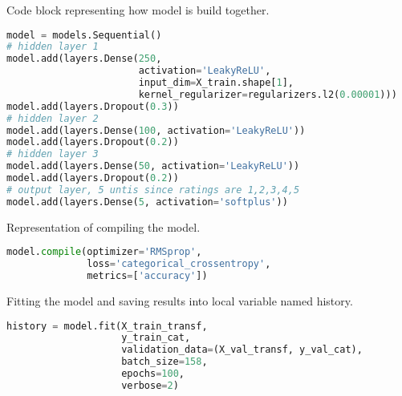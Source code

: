Code block representing how model is build together.
\begin{lstlisting}[language=Python, caption=Build model]
model = models.Sequential()
# hidden layer 1
model.add(layers.Dense(250, 
                       activation='LeakyReLU', 
                       input_dim=X_train.shape[1], 
                       kernel_regularizer=regularizers.l2(0.00001)))
model.add(layers.Dropout(0.3))
# hidden layer 2
model.add(layers.Dense(100, activation='LeakyReLU'))
model.add(layers.Dropout(0.2))
# hidden layer 3
model.add(layers.Dense(50, activation='LeakyReLU'))
model.add(layers.Dropout(0.2))
# output layer, 5 untis since ratings are 1,2,3,4,5
model.add(layers.Dense(5, activation='softplus'))
\end{lstlisting}
Representation of compiling the model.
\begin{lstlisting}[language=Python, caption=Compile model]
model.compile(optimizer='RMSprop', 
              loss='categorical_crossentropy',
              metrics=['accuracy'])
\end{lstlisting}
Fitting the model and saving results into local variable named history.
\begin{lstlisting}[language=Python, caption=Fit model]
history = model.fit(X_train_transf, 
                    y_train_cat, 
                    validation_data=(X_val_transf, y_val_cat),
                    batch_size=158, 
                    epochs=100, 
                    verbose=2)
\end{lstlisting}